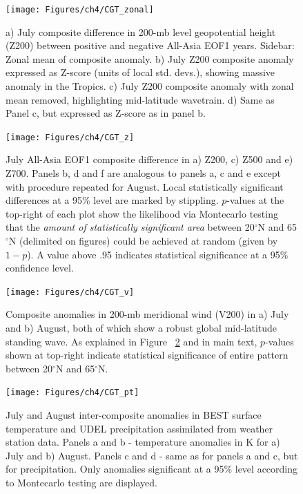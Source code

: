 \newpage
\clearpage



\begin{figure}
\centering
\noindent\texttt{[image: Figures/ch4/CGT\_zonal]}
\caption{a) July composite difference in 200-mb level geopotential height (Z200) between positive and negative All-Asia EOF1 years. Sidebar: Zonal mean of composite anomaly. b) July Z200 composite anomaly expressed as Z-score (units of local std. devs.), showing massive anomaly in the Tropics. c) July Z200 composite anomaly with zonal mean removed, highlighting mid-latitude wavetrain. d) Same as Panel c, but expressed as Z-score as in panel b.}
\label{fig:cgt_zonal}
\end{figure}

\begin{figure}
\centering
\noindent\texttt{[image: Figures/ch4/CGT\_z]}
\caption{July All-Asia EOF1 composite difference in a) Z200, c) Z500 and e) Z700. Panels b, d and f are analogous to panels a, c and e except with procedure repeated for August. Local statistically significant differences at a 95\% level are marked by stippling. $p$-values at the top-right of each plot show the likelihood via Montecarlo testing that the \textit{amount of statistically significant area} between 20$^{\circ}$N and 65$^{\circ}$N (delimited on figures) could be achieved at random (given by $1-p$). A value above .95 indicates statistical significance at a 95\% confidence level.}
\label{fig:cgt_z}
\end{figure}

\begin{figure}
\centering
\noindent\texttt{[image: Figures/ch4/CGT\_v]}
\caption{Composite anomalies in 200-mb meridional wind (V200) in a) July and b) August, both of which show a robust global mid-latitude standing wave. As explained in Figure ~\ref{fig:cgt_z} and in main text, $p$-values shown at top-right indicate statistical significance of entire pattern between 20$^{\circ}$N and 65$^{\circ}$N.}
\label{fig:cgt_v}
\end{figure}

\begin{figure}
\centering
\noindent\texttt{[image: Figures/ch4/CGT\_pt]}
\caption{July and August inter-composite anomalies in BEST surface temperature and UDEL precipitation assimilated from weather station data. Panels a and b - temperature anomalies in K for a) July and b) August. Panels c and d - same as for panels a and c, but for precipitation. Only anomalies significant at a 95\% level according to Montecarlo testing are displayed.}
\label{fig:cgt_pt}
\end{figure}

